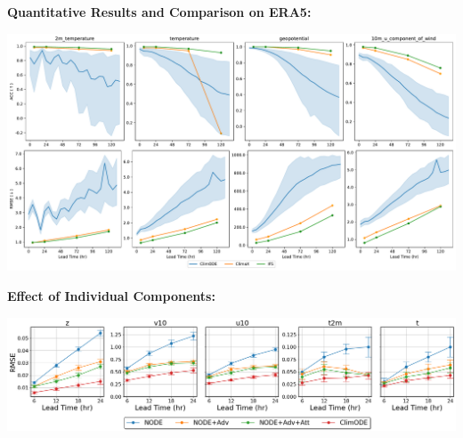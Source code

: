 \documentclass[landscape,a1paper,fontscale=0.424]{baposter}
\begin{document}
\begin{poster}
{\begin{minipage}[t]{0.50\textwidth}
            \textbf{\color{blue}Quantitative Results and Comparison on ERA5:}
            \vspace{-0.5em}
            \begin{center}
                \includegraphics[width=\textwidth]{acc_rmse.pdf}
            \end{center}
        \end{minipage}\hfill
        \begin{minipage}[t]{0.50\textwidth}
            \textbf{\color{blue}Effect of Individual Components:}
            \vspace{-0.5em}
            \begin{center}
                \includegraphics[width=\textwidth]{ablation.png}
            \end{center}


\end{minipage}}
\end{poster}
\end{document}

